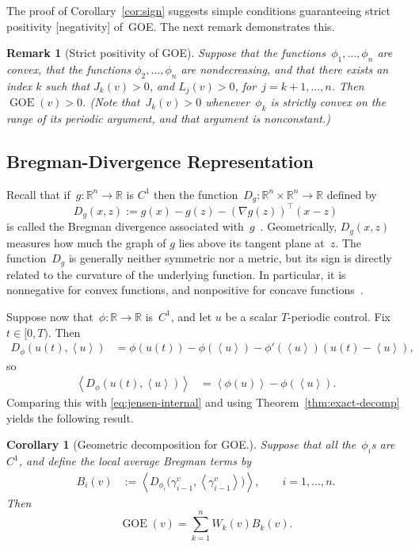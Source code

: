 \documentclass[onecolumn]{IEEEtran}
\newcommand{\R}{\mathbb{R}}
\newcommand{\GOE}{\operatorname{GOE}}
\newcommand{\avg}[1]{\left\langle #1\right\rangle}
\newtheorem{corollary}[theorem]{Corollary}
\newtheorem{remark}[theorem]{Remark}
\begin{document}
The proof of 
Corollary~\ref{cor:sign} 
suggests simple conditions guaranteeing  strict positivity [negativity] of~GOE. The next remark demonstrates this.

\begin{remark}[Strict positivity of GOE]
\label{rem:strict}
Suppose that the functions~$\phi_1,\ldots,\phi_n$ are convex,   that the functions 
$\phi_2,\ldots,\phi_n$ are nondecreasing, 
and that there
 exists an index $k$ such that
   $ J_k(v)>0$, 
and
 $   L_j(v)>0$,
    for~$ j=k+1,\ldots,n$.
Then $\GOE(v)>0$. 
(Note that~$J_k(v)>0$ whenever~$\phi_k$ is strictly convex on the range of
its periodic argument,
and that argument is nonconstant.)
\end{remark}

 

\subsection{Bregman-Divergence Representation}
Recall that if~\(g:\mathbb R^n\to\mathbb R\) is $C^1$  
then the function~$D_g:\R^n\times\R^n\to\R$
defined by
\begin{equation}\label{eq:d_geq}
D_g(x,z):=
g(x)-g(z)-(\nabla g(z))^\top (x-z) 
\end{equation}
is called the
Bregman divergence associated with~\(g\)~\cite{bregman1967}.
Geometrically, $D_g(x,z)$
  measures how much the graph of $g$ lies above its tangent plane at~$z$. 
The function~$D_g$
     is generally
neither symmetric nor a metric, but its sign is directly related to the
curvature of the underlying function. In particular, it is nonnegative for
convex functions,  and nonpositive for concave functions~\cite{bregman1967}.


Suppose now that~$\phi:\R\to\R$ is~$C^1$, and 
let $u$ be a scalar $T$-periodic control.
Fix $t\in[0,T)$. Then
\begin{align*}
D_\phi(u(t),\avg{u})&=
\phi(u(t))-\phi(\avg{u})
-\phi'(\avg {u})(u(t)-\avg{u}),
\end{align*}
so
\begin{align*}
\avg{D_\phi(u(t),\avg{u}) }&=
\avg {\phi(u)}-\phi(\avg{u}).
\end{align*}
Comparing this with \eqref{eq:jensen-internal} and using Theorem~\ref{thm:exact-decomp} yields the following result.

\begin{corollary}
[Geometric decomposition for GOE.]
\label{prop:bregman} 
Suppose  that all the~$\phi_i$s are~$C^1$, and
define the local average Bregman terms by
\begin{align}\label{eq:big_b}
    B_i(v)
    &:=
    \avg{
    D_{\phi_i}
    \bigl(
    \gamma_{i-1}^v,
    \avg{\gamma_{i-1}^v}
    \bigr)
    },
    \qquad i=1,\ldots,n.
 \end{align}
Then
\begin{equation}
    \GOE(v)
    =
    \sum_{k=1}^n W_k(v)B_k(v).
    \label{eq:bregman-goe}
\end{equation}
\end{corollary}
\end{document}
